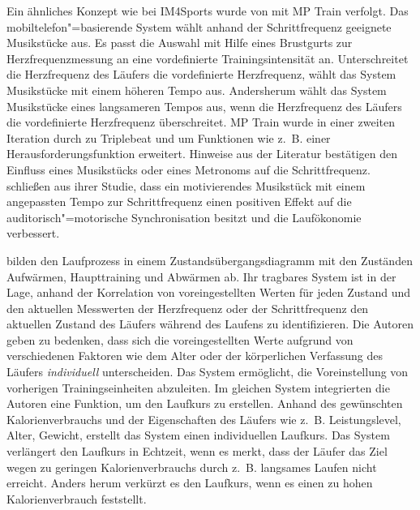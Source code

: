 Ein ähnliches Konzept wie bei IM4Sports wurde von \citet{Oliver2006} mit MP Train verfolgt. Das mobiltelefon"=basierende System wählt anhand der Schrittfrequenz geeignete Musikstücke aus. Es passt die Auswahl mit Hilfe eines Brustgurts zur Herzfrequenzmessung an eine vordefinierte Trainingsintensität an. Unterschreitet die Herzfrequenz des Läufers die vordefinierte Herzfrequenz, wählt das System Musikstücke mit einem höheren Tempo aus. Andersherum wählt das System Musikstücke eines langsameren Tempos aus, wenn die Herzfrequenz des Läufers die vordefinierte Herzfrequenz überschreitet. MP Train wurde in einer zweiten Iteration durch \citet{DeOliveira2008} zu Triplebeat und um Funktionen wie z.~B. einer Herausforderungsfunktion erweitert. Hinweise aus der Literatur \citep{Bood2013} bestätigen den Einfluss eines Musikstücks oder eines Metronoms auf die Schrittfrequenz. \citet{Bood2013} schließen aus ihrer Studie, dass ein motivierendes Musikstück mit einem angepassten Tempo zur Schrittfrequenz einen positiven Effekt auf die auditorisch"=motorische Synchronisation besitzt und die Laufökonomie verbessert.

\citet{Takata2007} bilden den Laufprozess in einem Zustandsübergangsdiagramm mit den Zuständen Aufwärmen, Haupttraining und Abwärmen ab. Ihr tragbares System ist in der Lage, anhand der Korrelation von voreingestellten Werten für jeden Zustand und den aktuellen Messwerten der Herzfrequenz oder der Schrittfrequenz den aktuellen Zustand des Läufers während des Laufens zu identifizieren. Die Autoren geben zu bedenken, dass sich die voreingestellten Werte aufgrund von verschiedenen Faktoren wie dem Alter oder der körperlichen Verfassung des Läufers \emph{individuell} unterscheiden. Das System ermöglicht, die Voreinstellung von vorherigen Trainingseinheiten abzuleiten. Im gleichen System integrierten die Autoren eine Funktion, um den Laufkurs zu erstellen. Anhand des gewünschten Kalorienverbrauchs und der Eigenschaften des Läufers wie z.~B. Leistungslevel, Alter, Gewicht, erstellt das System einen individuellen Laufkurs. Das System verlängert den Laufkurs in Echtzeit, wenn es merkt, dass der Läufer das Ziel wegen zu geringen Kalorienverbrauchs durch z.~B. langsames Laufen nicht erreicht. Anders herum verkürzt es den Laufkurs, wenn es einen zu hohen Kalorienverbrauch feststellt.

